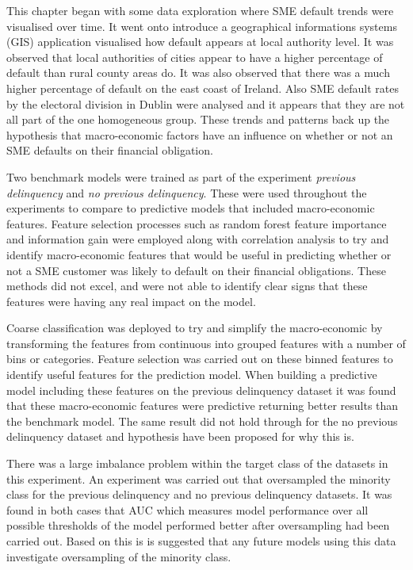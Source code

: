 This chapter began with some data exploration where SME default trends were visualised over time. It went onto introduce a geographical informations systems (GIS) application visualised how default appears at local authority level. It was observed that local authorities of cities appear to have a higher percentage of default than rural county areas do. It was also observed that there was a much higher percentage of default on the east coast of Ireland. Also SME default rates by the electoral division in Dublin were analysed and it appears that they are not all part of the one homogeneous group. These trends and patterns back up the hypothesis that macro-economic factors have an influence on whether or not an SME defaults on their financial obligation.

Two benchmark models were trained as part of the experiment \textit{previous delinquency} and \textit{no previous delinquency}. These were used throughout the experiments to compare to predictive models that included macro-economic features. Feature selection processes such as random forest feature importance and information gain were employed along with correlation analysis to try and identify macro-economic features that would be useful in predicting whether or not a SME customer was likely to default on their financial obligations. These methods did not excel, and were not able to identify clear signs that these features were having any real impact on the model. 

Coarse classification was deployed to try and simplify the macro-economic by transforming the features from continuous into grouped features with a number of bins or categories. Feature selection was carried out on these binned features to identify useful features for the prediction model. When building a predictive model including these features on the previous delinquency dataset it was found that these macro-economic features were predictive returning better results than the benchmark model. The same result did not hold through for the no previous delinquency dataset and hypothesis have been proposed for why this is.


There was a large imbalance problem within the target class of the datasets in this experiment. An experiment was carried out that oversampled the minority class for the previous delinquency and no previous delinquency datasets. It was found in both cases that AUC which measures model performance over all possible thresholds of the model performed better after oversampling had been carried out. Based on this is is suggested that any future models using this data investigate oversampling of the minority class.




  